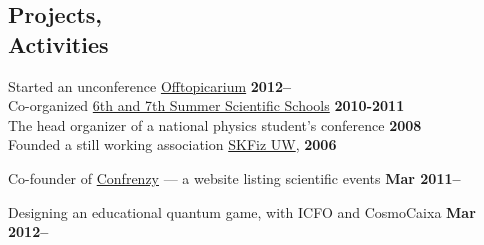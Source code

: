 \documentclass[margin,line]{resume}
\begin{document}
\begin{resume}
    \section{\mysidestyle Projects,\\Activities}

    \begin{list2}
    \item Started an unconference \href{http://offtopicarium.wikidot.com/en:start}{Offtopicarium} \hfill {\bf 2012--}\\
    Co-organized \href{http://warsztatywww.wikidot.com/en}{6th and 7th Summer Scientific Schools} \hfill {\bf 2010-2011}\\
    The head organizer of a national physics student's conference \hfill {\bf 2008}\\
    Founded a still working association \href{http://skfiz.fuw.edu.pl/en}{SKFiz UW}, \hfill {\bf 2006}

    \item Co-founder of \href{http://confrenzy.com}{Confrenzy} --- a website listing scientific events \hfill {\bf Mar 2011--}

    \item Designing an educational quantum game, with ICFO and CosmoCaixa \hfill {\bf Mar 2012--}
    \end{list2}



\end{resume}
\end{document}
